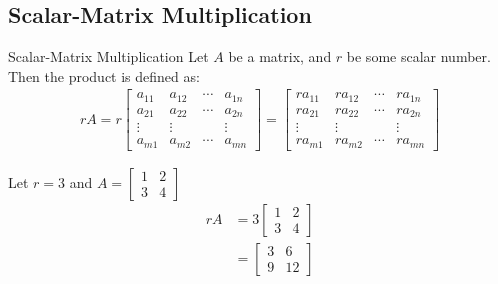 \documentclass[../notes.tex]{subfiles}
\begin{document}
			\subsection{Scalar-Matrix Multiplication}
				\begin{definition}[width=0.7\textwidth]{Scalar-Matrix Multiplication}
					Let $A$ be a matrix, and $r$ be some scalar number.\\
					Then the product  is defined as:
					\begin{align*}
						rA = r \begin{bmatrix}
							a_{11} & a_{12} & \cdots & a_{1n}\\
							a_{21} & a_{22} & \cdots & a_{2n}\\
							\vdots & \vdots & & \vdots\\
							a_{m1} & a_{m2} & \cdots & a_{mn}
						\end{bmatrix}
						= \begin{bmatrix}
							ra_{11} & ra_{12} & \cdots & ra_{1n}\\
							ra_{21} & ra_{22} & \cdots & ra_{2n}\\
							\vdots & \vdots & & \vdots\\
							ra_{m1} & ra_{m2} & \cdots & ra_{mn}
						\end{bmatrix}
					\end{align*}
				\end{definition}
				\begin{example}[width=0.42\textwidth]
					Let $r = 3$ and $A = \begin{bmatrix}
						1 & 2\\
						3 & 4
					\end{bmatrix}$
					\begin{align*}
						rA &= 3\begin{bmatrix}
							1 & 2\\
							3 & 4
						\end{bmatrix}\\
						&= \begin{bmatrix}
							3 & 6\\
							9 & 12
						\end{bmatrix}
					\end{align*}
				\end{example}
\end{document}
